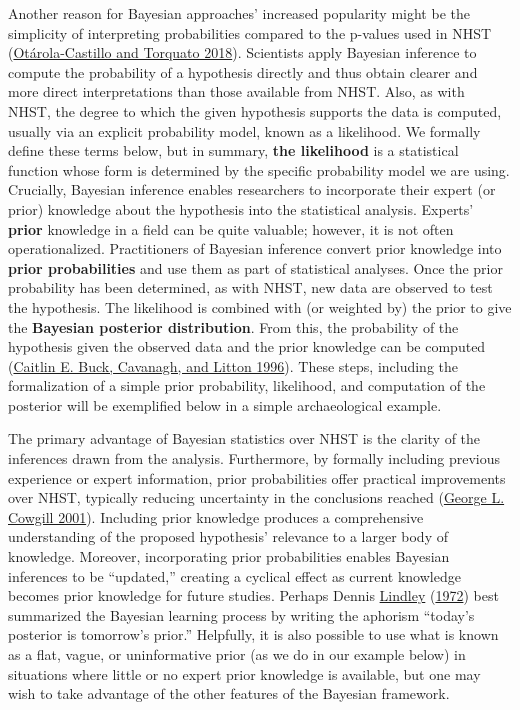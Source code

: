 \documentclass[
]{article}
\begin{document}
Another reason for Bayesian approaches' increased popularity might be
the simplicity of interpreting probabilities compared to the p-values
used in NHST
(\protect\hyperlink{ref-otarola-castillo_bayesian_2018}{Otárola-Castillo
and Torquato 2018}). Scientists apply Bayesian inference to compute the
probability of a hypothesis directly and thus obtain clearer and more
direct interpretations than those available from NHST. Also, as with
NHST, the degree to which the given hypothesis supports the data is
computed, usually via an explicit probability model, known as a
likelihood. We formally define these terms below, but in summary,
\textbf{the likelihood} is a statistical function whose form is
determined by the specific probability model we are using. Crucially,
Bayesian inference enables researchers to incorporate their expert (or
prior) knowledge about the hypothesis into the statistical analysis.
Experts' \textbf{prior} knowledge in a field can be quite valuable;
however, it is not often operationalized. Practitioners of Bayesian
inference convert prior knowledge into \textbf{prior probabilities} and
use them as part of statistical analyses. Once the prior probability has
been determined, as with NHST, new data are observed to test the
hypothesis. The likelihood is combined with (or weighted by) the prior
to give the \textbf{Bayesian posterior distribution}. From this, the
probability of the hypothesis given the observed data and the prior
knowledge can be computed
(\protect\hyperlink{ref-buck_bayesian_1996}{Caitlin E. Buck, Cavanagh,
and Litton 1996}). These steps, including the formalization of a simple
prior probability, likelihood, and computation of the posterior will be
exemplified below in a simple archaeological example.

The primary advantage of Bayesian statistics over NHST is the clarity of
the inferences drawn from the analysis. Furthermore, by formally
including previous experience or expert information, prior probabilities
offer practical improvements over NHST, typically reducing uncertainty
in the conclusions reached
(\protect\hyperlink{ref-cowgill_past_2001}{George L. Cowgill 2001}).
Including prior knowledge produces a comprehensive understanding of the
proposed hypothesis' relevance to a larger body of knowledge. Moreover,
incorporating prior probabilities enables Bayesian inferences to be
``updated,'' creating a cyclical effect as current knowledge becomes
prior knowledge for future studies. Perhaps Dennis
\protect\hyperlink{ref-lindley_bayesian_1972}{Lindley}
(\protect\hyperlink{ref-lindley_bayesian_1972}{1972}) best summarized
the Bayesian learning process by writing the aphorism ``today's
posterior is tomorrow's prior.'' Helpfully, it is also possible to use
what is known as a flat, vague, or uninformative prior (as we do in our
example below) in situations where little or no expert prior knowledge
is available, but one may wish to take advantage of the other features
of the Bayesian framework.
\end{document}

